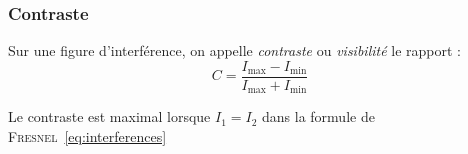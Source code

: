 \documentclass[11pt,a4paper,fleqn,pdftex]{report}
\begin{document}
\subsubsection{Contraste} %
\label{ssub:contraste}
\begin{dfn}
   Sur une figure d'interférence, on appelle \emph{contraste} ou \emph{visibilité} le rapport : 
   \begin{equation}
   C = \dfrac{I_{\text{max}} - I_{\text{min}}}{I_{\text{max}} + I_{\text{min}}}
   \end{equation}
\end{dfn}
\begin{theorem}
   Le contraste est maximal lorsque $I_1 = I_2$ dans la formule de \textsc{Fresnel}~\eqref{eq:interferences}
\end{theorem}
\end{document}
